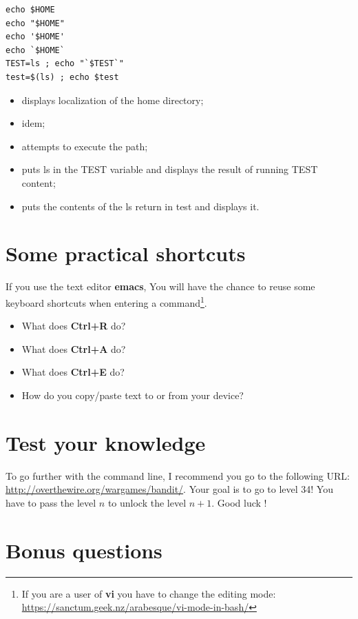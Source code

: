 \documentclass[11pt]{article}
\begin{document}
\begin{lstlisting}
echo $HOME
echo "$HOME"
echo '$HOME'
echo `$HOME`
TEST=ls ; echo "`$TEST`"
test=$(ls) ; echo $test
\end{lstlisting}

\begin{solution}
	\begin{itemize}
		\item displays localization of the home directory;
		\item idem;
		\item attempts to execute the path;
		\item puts ls in the TEST variable and displays the result of running TEST content;
		\item puts the contents of the ls return in test and displays it.
	\end{itemize}
\end{solution}


\section{Some practical shortcuts}

If you use the text editor \textbf{emacs}, You will have the chance to reuse some keyboard shortcuts when entering a command\footnote{If you are a user of \textbf{vi} you have to change the editing mode:
	\url{https://sanctum.geek.nz/arabesque/vi-mode-in-bash/}}.
\begin{itemize}
	\item What does \textbf{Ctrl+R} do?
	\item What does \textbf{Ctrl+A} do?
	\item What does \textbf{Ctrl+E} do?
	\item How do you copy/paste text to or from your device?
\end{itemize}


\section{Test your knowledge}

To go further with the command line, I recommend you go to the following URL: \url{http://overthewire.org/wargames/bandit/}. Your goal is to go to level 34! You have to pass the level \(n\) to unlock the level \(n + 1 \). Good luck !
\section{Bonus questions}
\end{document}
